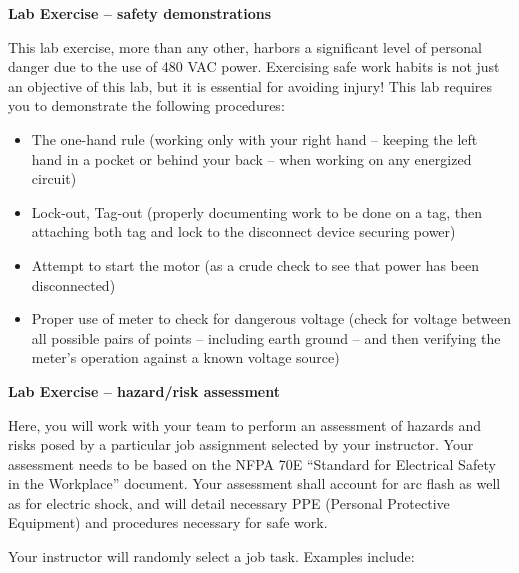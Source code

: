 \noindent
{\bf Lab Exercise -- safety demonstrations}

\vskip 5pt

This lab exercise, more than any other, harbors a significant level of personal danger due to the use of 480 VAC power.  Exercising safe work habits is not just an objective of this lab, but it is essential for avoiding injury!  This lab requires you to demonstrate the following procedures:

\begin{itemize}
\item{} The one-hand rule (working only with your right hand -- keeping the left hand in a pocket or behind your back -- when working on any energized circuit)
\vskip 10pt
\item{} Lock-out, Tag-out (properly documenting work to be done on a tag, then attaching both tag and lock to the disconnect device securing power)
\vskip 10pt
\item{} Attempt to start the motor (as a crude check to see that power has been disconnected)
\vskip 10pt
\item{} Proper use of meter to check for dangerous voltage (check for voltage between all possible pairs of points -- including earth ground -- and then verifying the meter's operation against a known voltage source)
\end{itemize}











\vfil \eject

\noindent
{\bf Lab Exercise -- hazard/risk assessment}

\vskip 5pt

Here, you will work with your team to perform an assessment of hazards and risks posed by a particular job assignment selected by your instructor.  Your assessment needs to be based on the NFPA 70E ``Standard for Electrical Safety in the Workplace'' document.  Your assessment shall account for arc flash as well as for electric shock, and will detail necessary PPE (Personal Protective Equipment) and procedures necessary for safe work.

Your instructor will randomly select a job task.  Examples include:

